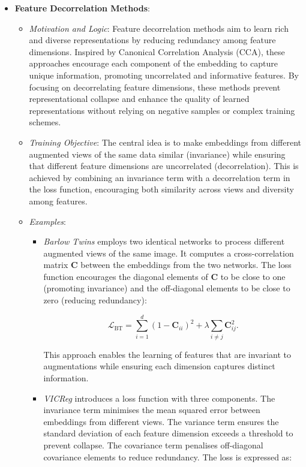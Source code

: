 \begin{itemize}
    \item \textbf{Feature Decorrelation Methods}:
    \begin{itemize}
        \item \emph{Motivation and Logic}: Feature decorrelation methods aim to learn rich and diverse representations by reducing redundancy among feature dimensions. Inspired by Canonical Correlation Analysis (CCA), these approaches encourage each component of the embedding to capture unique information, promoting uncorrelated and informative features. By focusing on decorrelating feature dimensions, these methods prevent representational collapse and enhance the quality of learned representations without relying on negative samples or complex training schemes.
        
        \item \emph{Training Objective}: The central idea is to make embeddings from different augmented views of the same data similar (invariance) while ensuring that different feature dimensions are uncorrelated (decorrelation). This is achieved by combining an invariance term with a decorrelation term in the loss function, encouraging both similarity across views and diversity among features.
        
        \item \emph{Examples}:
        \begin{itemize}
            \item \emph{Barlow Twins} \citep{zbontar2021barlow} employs two identical networks to process different augmented views of the same image. It computes a cross-correlation matrix \( \mathbf{C} \) between the embeddings from the two networks. The loss function encourages the diagonal elements of \( \mathbf{C} \) to be close to one (promoting invariance) and the off-diagonal elements to be close to zero (reducing redundancy):
        
            \[
            \mathcal{L}_{\text{BT}} = \sum_{i=1}^d (1 - \mathbf{C}_{ii})^2 + \lambda \sum_{i \neq j} \mathbf{C}_{ij}^2.
            \]
        
            This approach enables the learning of features that are invariant to augmentations while ensuring each dimension captures distinct information.
        
            \item \emph{VICReg} \citep{bardes2021vicreg} introduces a loss function with three components. The invariance term minimises the mean squared error between embeddings from different views. The variance term ensures the standard deviation of each feature dimension exceeds a threshold to prevent collapse. The covariance term penalises off-diagonal covariance elements to reduce redundancy. The loss is expressed as:
        

\end{itemize}
\end{itemize}
\end{itemize}
